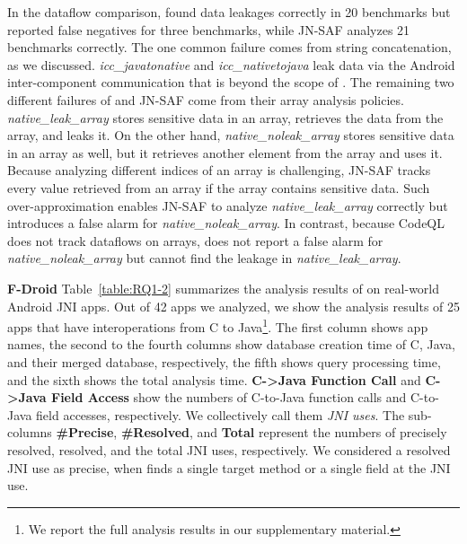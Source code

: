 

In the dataflow comparison, \ours found data leakages correctly in 20
benchmarks but reported false negatives for three benchmarks, while JN-SAF
analyzes 21 benchmarks correctly. 
The one common failure comes from string concatenation, as we discussed.
{\it icc\_javatonative} and {\it icc\_nativetojava} leak data via the Android
inter-component communication that is beyond the scope of \ours.
The remaining two different failures of \ours and JN-SAF come from their array analysis policies.
{\it native\_leak\_array} stores sensitive data in an array, retrieves the data from the array,
and leaks it.  On the other hand, {\it native\_noleak\_array} stores sensitive
data in an array as well, but it retrieves another element from the array and uses it.
Because analyzing different indices of an array is challenging, JN-SAF
tracks every value retrieved from an array if the array contains sensitive data.
Such over-approximation enables JN-SAF to analyze {\it
native\_leak\_array} correctly but introduces a false alarm for {\it
native\_noleak\_array}.  In contrast, because CodeQL does not
track dataflows on arrays, \ours does not report
a false alarm for {\it native\_noleak\_array} but cannot find the leakage in {\it
native\_leak\_array}.

\textbf{F-Droid} Table~\ref{table:RQ1-2} summarizes the analysis results of \ours on real-world Android JNI apps.
Out of 42 apps we analyzed, we show the analysis
results of 25 apps that have interoperations from C to Java\footnote{We
report the full analysis results in our supplementary material.}.
The first column shows app names, the second to the fourth columns show database
creation time of C, Java, and their merged database, respectively, the fifth
shows query processing time, and the sixth shows the total analysis time.
{\bf C->Java Function Call} and {\bf C->Java Field Access}
show the numbers of C-to-Java function calls and
C-to-Java field accesses, respectively. We collectively call them
\emph{JNI uses}.
The sub-columns {\bf \#Precise}, {\bf \#Resolved}, and {\bf Total}
represent the numbers of precisely resolved, 
resolved, and the total JNI uses, respectively.
We considered a resolved JNI use as precise, when \ours finds a single target method
or a single field at the JNI use.


